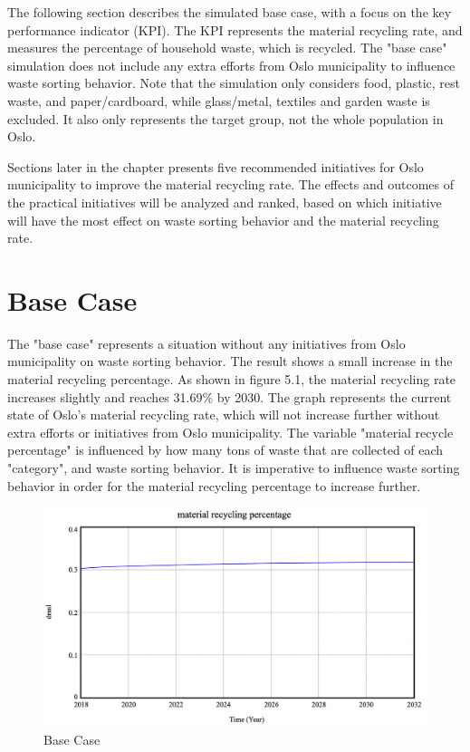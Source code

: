 The following section describes the simulated base case, with a focus on the key performance indicator (KPI). The KPI represents the material recycling rate, and measures the percentage of household waste, which is recycled. The "base case" simulation does not include any extra efforts from Oslo municipality to influence waste sorting behavior. Note that the simulation only considers food, plastic, rest waste, and paper/cardboard, while glass/metal, textiles and garden waste is excluded. It also only represents the target group, not the whole population in Oslo.  

\indent \newline
Sections later in the chapter presents five recommended initiatives for Oslo municipality to improve the material recycling rate. The effects and outcomes of the practical initiatives will be analyzed and ranked, based on which initiative will have the most effect on waste sorting behavior and the material recycling rate.  

\section{Base Case}

\indent \newline
The "base case" represents a situation without any initiatives from Oslo municipality on waste sorting behavior. The result shows a small increase in the material recycling percentage. As shown in figure 5.1, the material recycling rate increases slightly and reaches 31.69\% by 2030. The graph represents the current state of Oslo's material recycling rate, which will not increase further without extra efforts or initiatives from Oslo municipality. The variable "material recycle percentage" is influenced by how many tons of waste that are collected of each "category", and waste sorting behavior. It is imperative to influence waste sorting behavior in order for the material recycling percentage to increase further. 

\begin{figure}[H]
\centering
\includegraphics [scale=0.28,angle=360]{figures/basecase.png}
\caption{Base Case}
\label{fig:basecase}
\end{figure}

